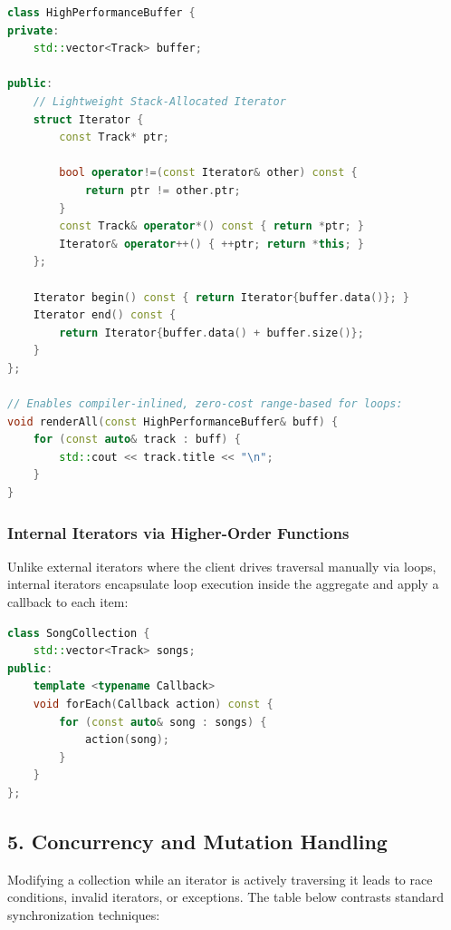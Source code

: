 \begin{lstlisting}[language=C++]
class HighPerformanceBuffer {
private:
    std::vector<Track> buffer;

public:
    // Lightweight Stack-Allocated Iterator
    struct Iterator {
        const Track* ptr;

        bool operator!=(const Iterator& other) const { 
            return ptr != other.ptr; 
        }
        const Track& operator*() const { return *ptr; }
        Iterator& operator++() { ++ptr; return *this; }
    };

    Iterator begin() const { return Iterator{buffer.data()}; }
    Iterator end() const { 
        return Iterator{buffer.data() + buffer.size()}; 
    }
};

// Enables compiler-inlined, zero-cost range-based for loops:
void renderAll(const HighPerformanceBuffer& buff) {
    for (const auto& track : buff) {
        std::cout << track.title << "\n";
    }
}
\end{lstlisting}

\subsubsection{Internal Iterators via Higher-Order Functions}
Unlike external iterators where the client drives traversal manually via loops, internal iterators encapsulate loop execution inside the aggregate and apply a callback to each item:

\begin{lstlisting}[language=C++]
class SongCollection {
    std::vector<Track> songs;
public:
    template <typename Callback>
    void forEach(Callback action) const {
        for (const auto& song : songs) {
            action(song);
        }
    }
};
\end{lstlisting}

\subsection{5. Concurrency and Mutation Handling}
Modifying a collection while an iterator is actively traversing it leads to race conditions, invalid iterators, or exceptions. The table below contrasts standard synchronization techniques:

